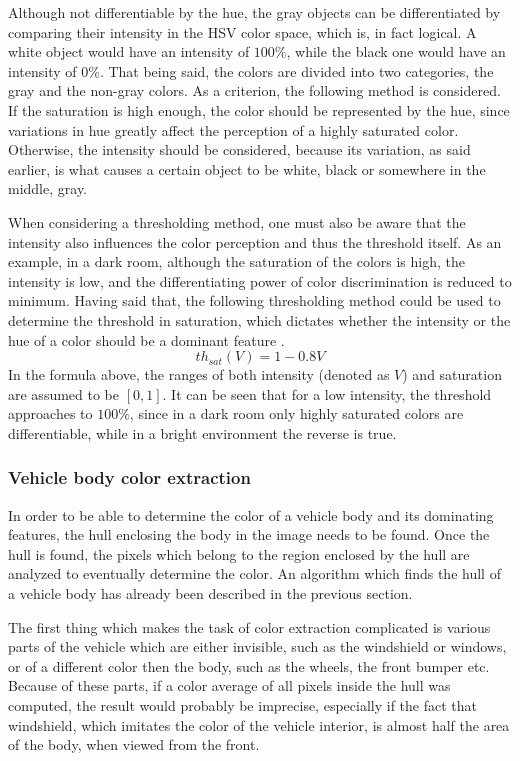 \documentclass[times, utf8, zavrsni]{fer}
\begin{document}
Although not differentiable by the hue, the gray objects can be differentiated
by comparing their intensity in the HSV color space, which is, in fact logical.
A white object would have an intensity of $100\%$, while the black one would
have an intensity of $0\%$. That being said, the colors are divided into two
categories, the gray and the non-gray colors. As a criterion, the following method is
considered. If the saturation is high enough, the color should be represented
by the hue, since variations in hue greatly affect the perception of a
highly saturated color. Otherwise, the intensity should be considered, because
its variation, as said earlier, is what causes a certain object to be white,
black or somewhere in the middle, gray. 

When considering a thresholding method, one must also be aware that the
intensity also influences the color perception and thus the threshold itself. As
an example, in a dark room, although the saturation of the colors is high, the
intensity is low, and the differentiating power of color discrimination is
reduced to minimum. Having said that, the following thresholding method could be
used to determine the threshold in saturation, which dictates whether the
intensity or the hue of a color should be a dominant feature 
\citep{hsv:domimant-feature}.
\[ th_{sat}(V) = 1 - 0.8 V \]
In the formula above, the ranges of both intensity (denoted as $V$) and
saturation are assumed to be $[0, 1]$. It can be seen that for a low intensity,
the threshold approaches to $100\%$, since in a dark room only highly saturated
colors are differentiable, while in a bright environment the reverse is true.

\subsubsection{Vehicle body color extraction}
In order to be able to determine the color of a vehicle body and its dominating
features, the hull enclosing the body in the image needs to be found. Once the
hull is found, the pixels which belong to the region enclosed by the hull are
analyzed to eventually determine the color. An algorithm which finds the hull of
a vehicle body has already been described in the previous section.

The first thing which makes the task of color extraction complicated is various
parts of the vehicle which are either invisible, such as the windshield or
windows, or of a different color then the body, such as the wheels, the front
bumper etc. Because of these parts, if a color average of all pixels inside the
hull was computed, the result would probably be imprecise, especially if the
fact that windshield, which imitates the color of the vehicle interior, is
almost half the area of the body, when viewed from the front.
\end{document}
